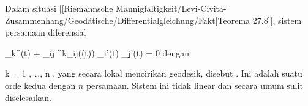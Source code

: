 {}
{

Dalam situasi
[[Riemannsche Mannigfaltigkeit/Levi-Civita-Zusammenhang/Geodätische/Differentialgleichung/Fakt|Teorema 27.8]],
sistem persamaan diferensial

\mavergleichskettedisp
{\vergleichskette
{ \gamma_k^{\prime \prime}(t) + \sum_{ij} \Gamma^k_{ij}(\gamma(t)) \gamma_i'(t) \gamma_j'(t)
}
{ =} { 0
}
{ } {
}
{ } {
}
{ } {
}
}
{}{}{}
dengan

\mavergleichskette
{\vergleichskette
{ k
}
{ = }{ 1  , \ldots , n
}
{  }{
}
{    }{
}
{   }{
}
}
{}{}{,}
yang secara lokal mencirikan geodesik, disebut  {.} Ini adalah suatu
orde kedua dengan $n$ persamaan. Sistem ini tidak linear dan secara umum sulit diselesaikan.

}

